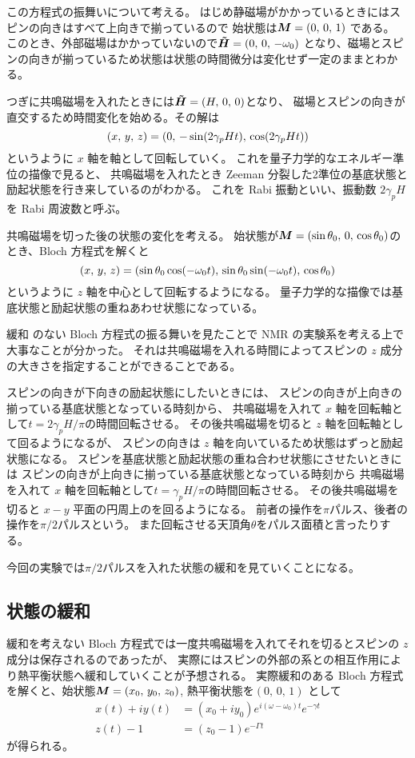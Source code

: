 \documentclass[11pt,dvipdfmx,a4paper]{jsarticle}
\begin{document}
この方程式の振舞いについて考える。
はじめ静磁場がかかっているときにはスピンの向きはすべて上向きで揃っているので
始状態は\(\vb*{M}=(0,\,0,\,1)\)
である。
このとき、外部磁場はかかっていないので\(\vb*{\tilde{H}}=(0,\,0,\,-\omega_0)\)
となり、磁場とスピンの向きが揃っているため状態は状態の時間微分は変化せず一定のままとわかる。

つぎに共鳴磁場を入れたときには\(\vb*{\tilde{H}}=(H,\,0,\,0)\)となり、
磁場とスピンの向きが直交するため時間変化を始める。その解は
\begin{equation}
	(x,\,y,\,z) = \qty(0,\,-\sin(2\gamma_p Ht),\,\cos(2\gamma_p Ht))
\end{equation}
というように \(x\) 軸を軸として回転していく。
これを量子力学的なエネルギー準位の描像で見ると、
共鳴磁場を入れたとき Zeeman 分裂した2準位の基底状態と励起状態を行き来しているのがわかる。
これを Rabi 振動といい、振動数 \(2\gamma_p H\) を Rabi 周波数と呼ぶ。

共鳴磁場を切った後の状態の変化を考える。
始状態が\(\vb*{M}=(\sin\theta_0,\,0,\,\cos\theta_0)\)のとき、Bloch 方程式を解くと
\begin{equation}
	(x,\,y,\,z) =
	\qty(\sin\theta_0\cos(-\omega_0 t),\,
	\sin\theta_0\sin(-\omega_0 t),\,\cos\theta_0)
\end{equation}
というように \(z\) 軸を中心として回転するようになる。
量子力学的な描像では基底状態と励起状態の重ねあわせ状態になっている。

緩和 のない Bloch 方程式の振る舞いを見たことで NMR の実験系を考える上で大事なことが分かった。
それは共鳴磁場を入れる時間によってスピンの \(z\) 成分の大きさを指定することができることである。

スピンの向きが下向きの励起状態にしたいときには、
スピンの向きが上向きの揃っている基底状態となっている時刻から、
共鳴磁場を入れて \(x\) 軸を回転軸として\(t=2\gamma_pH/\pi\)の時間回転させる。
その後共鳴磁場を切ると \(z\) 軸を回転軸として回るようになるが、
スピンの向きは \(z\) 軸を向いているため状態はずっと励起状態になる。
スピンを基底状態と励起状態の重ね合わせ状態にさせたいときには
スピンの向きが上向きに揃っている基底状態となっている時刻から
共鳴磁場を入れて \(x\) 軸を回転軸として\(t=\gamma_pH/\pi\)の時間回転させる。
その後共鳴磁場を切ると \(x-y\) 平面の円周上のを回るようになる。
前者の操作を\(\pi\)パルス、後者の操作を\(\pi/2\)パルスという。
また回転させる天頂角\(\theta\)をパルス面積と言ったりする。

今回の実験では\(\pi/2\)パルスを入れた状態の緩和を見ていくことになる。

\subsection{状態の緩和}
緩和を考えない Bloch 方程式では一度共鳴磁場を入れてそれを切るとスピンの \(z\) 成分は保存されるのであったが、
実際にはスピンの外部の系との相互作用により熱平衡状態へ緩和していくことが予想される。
実際緩和のある Bloch 方程式を解くと、始状態\(\vb*{M}=\qty(x_0,\,y_0,\,z_0)\), 熱平衡状態を\((0,\,0,\,1)\)
として
\begin{align}
	x(t) + iy(t) &= (x_0 + iy_0) e^{i(\omega-\omega_0)t}e^{-\gamma t}\\
	z(t) - 1 &= (z_0 -1) e^{-\Gamma t}
\end{align}
が得られる。
\end{document}
